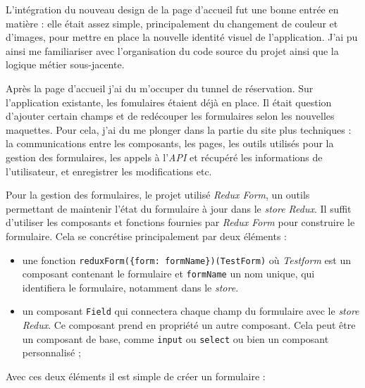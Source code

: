 \bigskip

L'intégration du nouveau design de la page d'accueil fut une bonne
entrée en matière : elle était assez simple, principalement du
changement de couleur et d'images, pour mettre en place la nouvelle
identité visuel de l'application. J'ai pu ainsi me familiariser avec
l'organisation du code source du projet ainsi que la logique métier
sous-jacente.

\bigskip

Après la page d'accueil j'ai du m'occuper du tunnel de réservation. Sur
l'application existante, les fomulaires étaient déjà en place. Il était
question d'ajouter certain champs et de redécouper les formulaires selon
les nouvelles maquettes. Pour cela, j'ai du me plonger dans la partie du
site plus techniques : la communications entre les composants, les
pages, les outils utilisés pour la gestion des formulaires, les appels à
l'\emph{API} et récupéré les informations de l'utilisateur, et
enregistrer les modifications etc.

\bigskip

Pour la gestion des formulaires, le projet utilisé \emph{Redux Form}, un
outils permettant de maintenir l'état du formulaire à jour dans le
\emph{store Redux}. Il suffit d'utiliser les composants et fonctions
fournies par \emph{Redux Form} pour construire le formulaire. Cela se
concrétise principalement par deux éléments :

\begin{itemize}
\tightlist
\item
  une fonction
  \texttt{reduxForm(\{form:\ \textquotesingle{}formName\textquotesingle{}\})(TestForm)}
  où \emph{Testform} est un composant contenant le formulaire et
  \texttt{formName} un nom unique, qui identifiera le formulaire,
  notamment dans le \emph{store}.
\item
  un composant \texttt{Field} qui connectera chaque champ du formulaire
  avec le \emph{store Redux}. Ce composant prend en propriété un autre
  composant. Cela peut être un composant de base, comme \texttt{input}
  ou \texttt{select} ou bien un composant personnalisé ;
\end{itemize}

Avec ces deux éléments il est simple de créer un formulaire :

